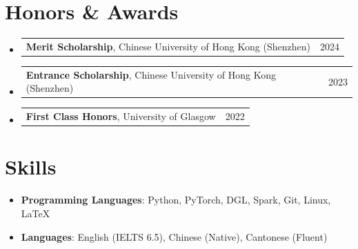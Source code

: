 \documentclass[letterpaper,11pt]{article}
\makeatletter
\newcommand{\resumeSubHeadingListStart}{\begin{itemize}[leftmargin=0.0in, label={}]}
\newcommand{\resumeSubHeadingListEnd}{\end{itemize}}
\newcommand{\resumeProjectHeading}[2]{
    \item
    \begin{tabular*}{0.97\textwidth}{l@{\extracolsep{\fill}}r}
      \small#1 & #2 \\
    \end{tabular*}\vspace{-7pt}
}
\makeatother
\begin{document}
\section{Honors \& Awards}
\resumeSubHeadingListStart
\resumeProjectHeading{\textbf{Merit Scholarship}, Chinese University of Hong Kong (Shenzhen)}{2024}
\resumeProjectHeading{\textbf{Entrance Scholarship}, Chinese University of Hong Kong (Shenzhen)}{2023}
\resumeProjectHeading{\textbf{First Class Honors}, University of Glasgow}{2022}
\resumeSubHeadingListEnd

\section{Skills}
\begin{itemize}[leftmargin=0.15in, label={}]
    \item \textbf{Programming Languages}{: Python, PyTorch, DGL, Spark, Git, Linux, LaTeX}
    \vspace{-8pt}
    \item \textbf{Languages}{: English (IELTS 6.5), Chinese (Native), Cantonese (Fluent)}
\end{itemize}
\end{document}
